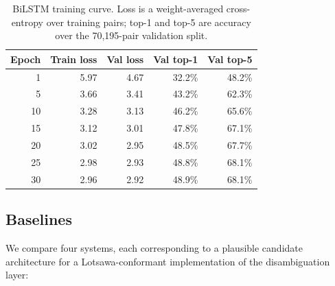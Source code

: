 \documentclass[11pt]{article}
\begin{document}
\begin{table}[t]
\centering
\small
\begin{tabular}{rrrrr}
\toprule
Epoch & Train loss & Val loss & Val top-1 & Val top-5 \\
\midrule
1  & 5.97 & 4.67 & 32.2\% & 48.2\% \\
5  & 3.66 & 3.41 & 43.2\% & 62.3\% \\
10 & 3.28 & 3.13 & 46.2\% & 65.6\% \\
15 & 3.12 & 3.01 & 47.8\% & 67.1\% \\
20 & 3.02 & 2.95 & 48.5\% & 67.7\% \\
25 & 2.98 & 2.93 & 48.8\% & 68.1\% \\
30 & 2.96 & 2.92 & 48.9\% & 68.1\% \\
\bottomrule
\end{tabular}
\caption{BiLSTM training curve. Loss is a weight-averaged cross-entropy over training pairs; top-1 and top-5 are accuracy over the 70{,}195-pair validation split.}
\label{tab:training}
\end{table}

\subsection{Baselines}

We compare four systems, each corresponding to a plausible candidate architecture for a Lotsawa-conformant implementation of the disambiguation layer:
\end{document}
